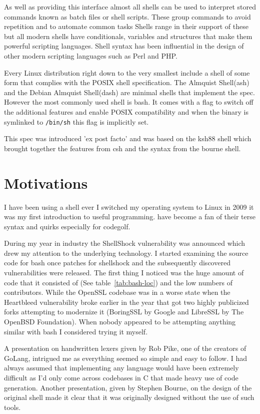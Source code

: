 As well as providing this interface almost all shells can be used to interpret stored commands known as batch files or shell scripts.
These group commands to avoid repetition and to automate common tasks
Shells range in their support of these but all modern shells have conditionals, variables and structures that make them powerful scripting languages.
Shell syntax has been influential in the design of other modern scripting languages such as Perl and PHP.

Every Linux distribution right down to the very smallest\cite{ALPINE-LINUX} include a shell of some form that complies with the POSIX shell specification\cite{POSIX-SHELL-STANDARD}. The Almquist Shell(ash) and the Debian Almquist Shell(dash) are minimal shells that implement the spec.
However the most commonly used shell is bash.
It comes with a flag to switch off the additional features and enable POSIX compatibility and when the binary is symlinked to \verb!/bin/sh! this flag is implicitly set.

This spec was introduced 'ex post facto' and was based on the ksh88 shell which  brought together the features from csh and the syntax from the bourne shell.  

\section{Motivations}
I have been using a shell ever I switched my operating system to Linux in 2009 it was my first introduction to useful programming.
have become a fan of their terse syntax and quirks especially for codegolf\cite{CODE-GOLF}.

During my year in industry the ShellShock\cite{SHELLSHOCK-CVE,SHELLSHOCK-LWN,SHELLSHOCK-SYMANTEC} vulnerability was announced which drew my attention to the underlying technology.
I started examining the source code for bash once patches for shellshock and the subsequently discovered vulnerabilities were released.
The first thing I noticed was the huge amount of code that it consisted of (See table~\ref{tab:bash-loc}) and the low numbers of contributors.
While the OpenSSL codebase was in a worse state when the Heartbleed vulnerability broke earlier in the year that got two highly publicized forks attempting to modernize it (BoringSSL by Google\cite{BORINGSSL} and LibreSSL by The OpenBSD Foundation\cite{LIBRESSL}).
When nobody appeared to be attempting anything similar with bash I considered trying it myself.

A presentation on handwritten lexers\cite{PIKE-LEXING-VIDEO} given by Rob Pike, one of the creators of GoLang, intrigued me as everything seemed so simple and easy to follow. 
I had always assumed that implementing any language would have been extremely difficult as I'd only come across codebases in C that made heavy use of code generation.
Another presentation, given by Stephen Bourne, on the design of the original shell\cite{DESIGN-OF-SH-VIDEO} made it clear that it was originally designed without the use of such tools.

